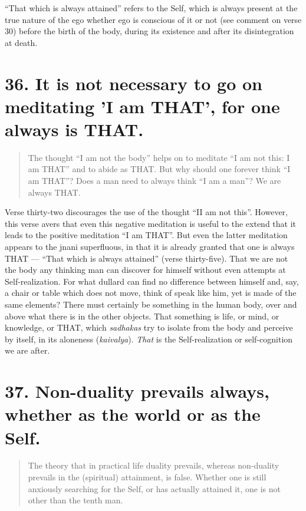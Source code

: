 \documentclass[12pt]{report}
\begin{document}
``That which is always attained'' refers to the Self, which is always
present at the true nature of the ego whether ego is conscious of it
or not (see comment on verse 30) before the birth of the body, during
its existence and after its disintegration at death.

\section{36. It is not necessary to go on meditating 'I am THAT', for
  one always is THAT.}

\begin{quote}
  The thought ``I am not the body'' helps on to meditate ``I am not
  this: I am THAT'' and to abide as THAT. But why should one forever
  think ``I am THAT''? Does a man need to always think ``I am a man''?
  We are always THAT.
\end{quote}

\index{}

Verse thirty-two discourages the use of the thought ``II am not
this''. However, this verse avers that even this negative meditation
is useful to the extend that it leads to the positive meditation ``I
am THAT''. But even the latter meditation appears to the jnani
superfluous, in that it is already granted that one is always THAT ---
``That which is always attained'' (verse thirty-five). That we are not
the body any thinking man can discover for himself without even
attempts at Self-realization. For what dullard can find no difference
between himself and, say, a chair or table which does not move, think
of speak like him, yet is made of the same elements? There must
certainly be something in the human body, over and above what there is
in the other objects. That something is life, or mind, or knowledge,
or THAT, which \emph{sadhakas} try to isolate from the body and
perceive by itself, in its aloneness (\emph{kaivalya}). \emph{That} is
the Self-realization or self-cognition we are after.

\section{37. Non-duality prevails always, whether as the world or as
  the Self.}

\begin{quote}
  The theory that in practical life duality prevails, whereas
  non-duality prevails in the (spiritual) attainment, is
  false. Whether one is still anxiously searching for the Self, or has
  actually attained it, one is not other than the tenth man.
\end{quote}
\end{document}

